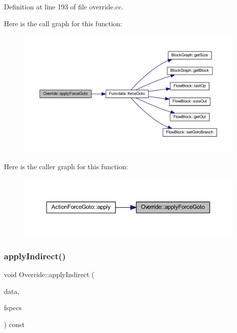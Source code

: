 Definition at line 193 of file override.\+cc.

Here is the call graph for this function\+:
\nopagebreak
\begin{figure}[H]
\begin{center}
\leavevmode
\includegraphics[width=350pt]{class_override_a7920e3b6030b283342a0da67fbc69505_cgraph}
\end{center}
\end{figure}
Here is the caller graph for this function\+:
\nopagebreak
\begin{figure}[H]
\begin{center}
\leavevmode
\includegraphics[width=350pt]{class_override_a7920e3b6030b283342a0da67fbc69505_icgraph}
\end{center}
\end{figure}
\mbox{\label{class_override_aa3bc812ae7fb2d03f14d2d67adbb6ede}} 
\subsubsection{\texorpdfstring{applyIndirect()}{applyIndirect()}}
{\footnotesize\ttfamily void Override\+::apply\+Indirect (\begin{DoxyParamCaption}\item[{\mbox{\hyperlink{class_funcdata}{Funcdata}} \&}]{data,  }\item[{\mbox{\hyperlink{class_func_call_specs}{Func\+Call\+Specs}} \&}]{fspecs }\end{DoxyParamCaption}) const}




